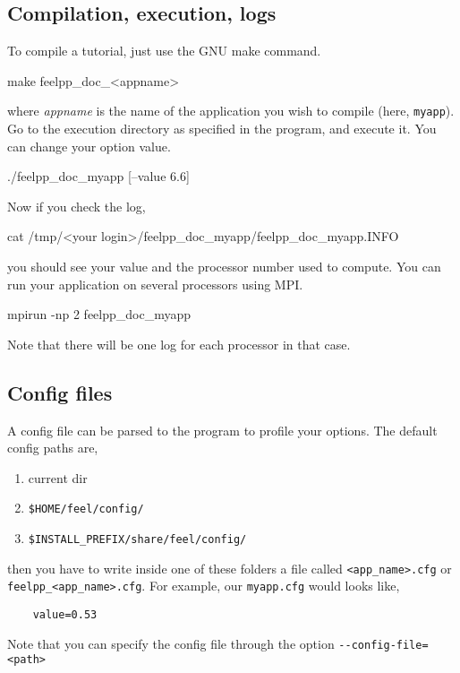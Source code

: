 

\subsection{Compilation, execution, logs}

To compile a tutorial, just use the GNU make command.
%
\begin{unixcom}
    make feelpp_doc_<appname>
\end{unixcom}
%
where \textit{appname} is the name of the application you wish to
compile (here, \lstinline!myapp!).
Go to the execution directory as specified in the program,
and execute it. You can change your option value.
%
\begin{unixcom}
    ./feelpp_doc_myapp [--value 6.6]
\end{unixcom}
%
Now if you check the log,
%
\begin{unixcom}
    cat /tmp/<your login>/feelpp_doc_myapp/feelpp_doc_myapp.INFO
\end{unixcom}
%
you should see your value and the processor number used to compute.
You can run your application on several processors using MPI.
%
\begin{unixcom}
    mpirun -np 2 feelpp_doc_myapp
\end{unixcom}
%
Note that there will be one log for each processor in that case.


\subsection{Config files}

A config file can be parsed to the program to profile your options.
The default config paths are,
\begin{enumerate}
    \item current dir
    \item \verb|$HOME/feel/config/|
    \item \verb|$INSTALL_PREFIX/share/feel/config/|
\end{enumerate}
then you have to write inside one of these folders a file called
\lstinline!<app_name>.cfg! or \lstinline!feelpp_<app_name>.cfg!.
For example, our \lstinline!myapp.cfg! would looks like,
%
\vspace{2mm}
\begin{lstlisting}
    value=0.53
\end{lstlisting}
\vspace{2mm}
%
Note that you can specify the config file through the option \lstinline!--config-file=<path>!

